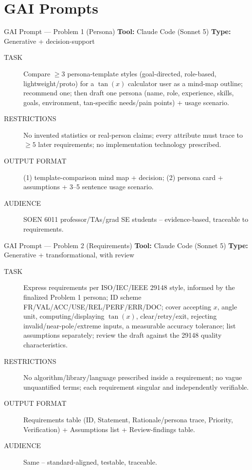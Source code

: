 \documentclass[10pt]{beamer}
\begin{document}
\section{GAI Prompts}
\begin{frame}{GAI Prompt --- Problem 1 (Persona)}
  \footnotesize
  \textbf{Tool:} Claude Code (Sonnet 5) \quad \textbf{Type:} Generative + decision-support
  \begin{description}
    \item[TASK] Compare $\ge 3$ persona-template styles (goal-directed, role-based, lightweight/proto) for a $\tan(x)$ calculator user as a mind-map outline; recommend one; then draft one persona (name, role, experience, skills, goals, environment, tan-specific needs/pain points) + usage scenario.
    \item[RESTRICTIONS] No invented statistics or real-person claims; every attribute must trace to $\ge 5$ later requirements; no implementation technology prescribed.
    \item[OUTPUT FORMAT] (1) template-comparison mind map + decision; (2) persona card + assumptions + 3--5 sentence usage scenario.
    \item[AUDIENCE] SOEN 6011 professor/TAs/grad SE students -- evidence-based, traceable to requirements.
  \end{description}
\end{frame}

\begin{frame}{GAI Prompt --- Problem 2 (Requirements)}
  \footnotesize
  \textbf{Tool:} Claude Code (Sonnet 5) \quad \textbf{Type:} Generative + transformational, with review
  \begin{description}
    \item[TASK] Express requirements per ISO/IEC/IEEE 29148 style, informed by the finalized Problem 1 persona; ID scheme FR/VAL/ACC/USE/REL/PERF/ERR/DOC; cover accepting $x$, angle unit, computing/displaying $\tan(x)$, clear/retry/exit, rejecting invalid/near-pole/extreme inputs, a measurable accuracy tolerance; list assumptions separately; review the draft against the 29148 quality characteristics.
    \item[RESTRICTIONS] No algorithm/library/language prescribed inside a requirement; no vague unquantified terms; each requirement singular and independently verifiable.
    \item[OUTPUT FORMAT] Requirements table (ID, Statement, Rationale/persona trace, Priority, Verification) + Assumptions list + Review-findings table.
    \item[AUDIENCE] Same -- standard-aligned, testable, traceable.
  \end{description}
\end{frame}
\end{document}
